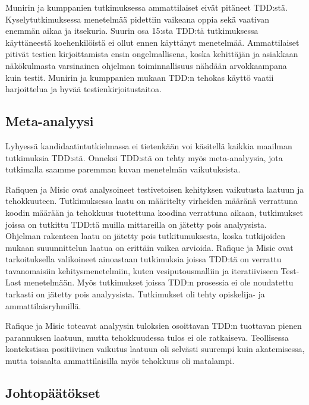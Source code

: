 \documentclass[finnish]{tktltiki2}
\theoremstyle{definition}
\theoremstyle{remark}
\begin{document}
Munirin ja kumppanien \cite{Munir14} tutkimuksessa ammattilaiset eivät pitäneet TDD:stä. Kyselytutkimuksessa menetelmää pidettiin vaikeana oppia sekä vaativan enemmän aikaa ja itsekuria. Suurin osa 15:sta TDD:tä tutkimuksessa käyttäneestä koehenkilöistä ei ollut ennen käyttänyt menetelmää. Ammattilaiset pitivät testien kirjoittamista ensin ongelmallisena, koska kehittäjän ja asiakkaan näkökulmasta varsinainen ohjelman toiminnallisuus nähdään arvokkaampana kuin testit. Munirin ja kumppanien mukaan TDD:n tehokas käyttö vaatii harjoittelua ja hyvää testienkirjoitustaitoa.


\subsection{Meta-analyysi}

Lyhyessä kandidaatintutkielmassa ei tietenkään voi käsitellä kaikkia maailman tutkimuksia TDD:stä. Onneksi TDD:stä on tehty myös meta-analyysia, jota tutkimalla saamme paremman kuvan menetelmän vaikutuksista.

Rafiquen ja Misic \cite{Rafique13} ovat analysoineet testivetoisen kehityksen vaikutusta laatuun ja tehokkuuteen. Tutkimuksessa laatu on määritelty virheiden määränä verrattuna koodin määrään ja tehokkuus tuotettuna koodina verrattuna aikaan, tutkimukset joissa on tutkittu TDD:tä muilla mittareilla on jätetty pois analyysista. Ohjelman rakenteen laatu on jätetty pois tutkitumuksesta, koska tutkijoiden mukaan suuunnittelun laatua on erittäin vaikea arvioida.  Rafique ja Misic ovat tarkoituksella valikoineet ainoastaan tutkimuksia joissa TDD:tä on verrattu tavanomaisiin kehitysmenetelmiin, kuten vesiputousmalliin ja iteratiiviseen Test-Last menetelmään. Myös tutkimukset joissa TDD:n prosessia ei ole noudatettu tarkasti on jätetty pois analyysista. Tutkimukset oli tehty opiskelija- ja ammattilaisryhmillä.

Rafique ja Misic toteavat analyysin tuloksien osoittavan TDD:n tuottavan pienen parannuksen laatuun, mutta tehokkuudessa tulos ei ole ratkaiseva. Teollisessa kontekstissa positiivinen vaikutus laatuun oli selvästi suurempi kuin akatemisessa, mutta toisaalta ammattilaisilla myös tehokkuus oli matalampi.





\subsection{Johtopäätökset}
\end{document}
